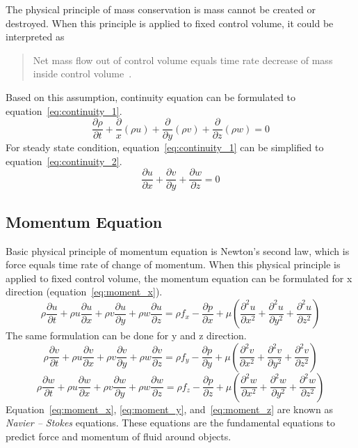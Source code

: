The physical principle of mass conservation is mass cannot be created or destroyed. When this principle is applied to fixed control volume, it could be interpreted as
\begin{quote}
Net mass flow out of control volume equals time rate decrease of mass inside control volume~\cite{JA}.
\end{quote}  
Based on this assumption, continuity equation can be formulated to equation~\ref{eq:continuity_1}.
\begin{equation}\label{eq:continuity_1}
  \frac{\partial \rho}{\partial t} + \frac{\partial}{x}\left( \rho u \right) + \frac{\partial}{\partial y}\left( \rho v \right) + \frac{\partial}{\partial z}\left( \rho w \right) = 0
\end{equation}
For steady state condition, equation~\ref{eq:continuity_1} can be simplified to equation~\ref{eq:continuity_2}. 
\begin{equation}\label{eq:continuity_2}
\frac{\partial u}{\partial x} + \frac{\partial v}{\partial y} + \frac{\partial w}{\partial z} = 0
\end{equation}

\subsection{Momentum Equation}
Basic physical principle of momentum equation is Newton's second law, which is force equals time rate of change of momentum. When this physical principle is applied to fixed control volume, the momentum equation can be formulated for x direction (equation~\ref{eq:moment_x}).
\begin{equation}\label{eq:moment_x}
\rho\frac{\partial u}{\partial t} + \rho u\frac{\partial u}{\partial x} + \rho v\frac{\partial u}{\partial y} + \rho w\frac{\partial u}{\partial z} = \rho f_x - \frac{\partial p}{\partial x} + \mu\left(\frac{\partial^2u}{\partial x^2} + \frac{\partial^2u}{\partial y^2} + \frac{\partial^2u}{\partial z^2}\right)
\end{equation}
The same formulation can be done for y and z direction.
\begin{equation}\label{eq:moment_y}
  \rho\frac{\partial v}{\partial t} + \rho u\frac{\partial v}{\partial x} + \rho v\frac{\partial v}{\partial y} + \rho w\frac{\partial v}{\partial z} = \rho f_y - \frac{\partial p}{\partial y} + \mu\left(\frac{\partial^2v}{\partial x^2} + \frac{\partial^2v}{\partial y^2} + \frac{\partial^2v}{\partial z^2}\right)
\end{equation}
\begin{equation}\label{eq:moment_z}
   \rho\frac{\partial w}{\partial t} + \rho u\frac{\partial w}{\partial x} + \rho v\frac{\partial w}{\partial y} + \rho w\frac{\partial w}{\partial z} = \rho f_z - \frac{\partial p}{\partial z} + \mu\left(\frac{\partial^2w}{\partial x^2} + \frac{\partial^2w}{\partial y^2} + \frac{\partial^2w}{\partial z^2}\right)
\end{equation}
Equation~\ref{eq:moment_x}, \ref{eq:moment_y}, and~\ref{eq:moment_z} are known as \emph{Navier -- Stokes} equations. These equations are the fundamental equations to predict force and momentum of fluid around objects.


